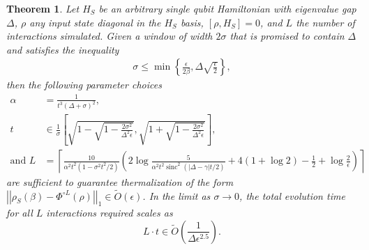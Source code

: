 \documentclass{article}
\newtheorem{theorem}{Theorem}
\newcommand{\norm}[1]{\left|\left| #1 \right|\right|}
\newcommand{\set}[1]{\left\{ #1 \right\}}
\newcommand{\bigotilde}[1]{\widetilde{O} \left( #1 \right)}
\DeclareMathOperator{\sinc}{sinc}
\begin{document}
\begin{theorem} \label{thm:single_qubit}
    Let $H_S$ be an arbitrary single qubit Hamiltonian with eigenvalue gap $\Delta$, $\rho$ any input state diagonal in the $H_S$ basis, $[\rho, H_S] = 0$, and $L$ the number of interactions simulated. Given a window of width $2 \sigma$ that is promised to contain $\Delta$ and satisfies the inequality
    \begin{align}
        \sigma \le \min \set{\frac{\epsilon}{2\beta}, \Delta \sqrt{\frac{\epsilon}{2}}},
    \end{align}
    then the following parameter choices 
    \begin{align}
        \alpha &= \frac{1}{t^3(\Delta + \sigma)^2}, \nonumber \\
        t &\in \frac{1}{\sigma}\left[\sqrt{1 - \sqrt{1 - \frac{2 \sigma^2}{\Delta^2 \epsilon}} }, \sqrt{1 + \sqrt{1 - \frac{2 \sigma^2}{\Delta^2 \epsilon}} } \right], \nonumber\\
        \text{and } L &= \left\lceil\frac{10}{\alpha^2 t^2 (1 - \sigma^2 t^2 / 2)} \left( 2 \log \frac{5}{\alpha^2 t^2 \sinc^2(|\Delta - \gamma|t/2)} + 4( 1 + \log 2) - \frac{1}{2} + \log \frac{2}{\epsilon} \right)\right\rceil
    \end{align}
    are sufficient to guarantee thermalization of the form $\norm{\rho_S(\beta) - \Phi^{\circ L}(\rho)}_1 \in \bigotilde{\epsilon}$. In the limit as $\sigma \to 0$, the total evolution time for all $L$ interactions required scales as
    \begin{equation}
        L \cdot t \in \widetilde{O} \left( \frac{1}{\Delta \epsilon^{2.5}}\right).
    \end{equation}
\end{theorem}
\end{document}
